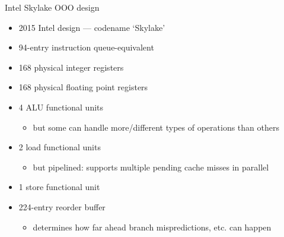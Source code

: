 \begin{frame}{Intel Skylake OOO design}
\begin{itemize}
\item 2015 Intel design --- codename `Skylake'
\item 94-entry instruction queue-equivalent
\item 168 physical integer registers
\item 168 physical floating point registers
\item 4 ALU functional units
    \begin{itemize}
    \item but some can handle more/different types of operations than others
    \end{itemize}
\item 2 load functional units
    \begin{itemize}
    \item but pipelined: supports multiple pending cache misses in parallel
    \end{itemize}
\item 1 store functional unit
\item 224-entry reorder buffer
    \begin{itemize}
    \item determines how far ahead branch mispredictions, etc. can happen
    \end{itemize}
\end{itemize}
\end{frame}
